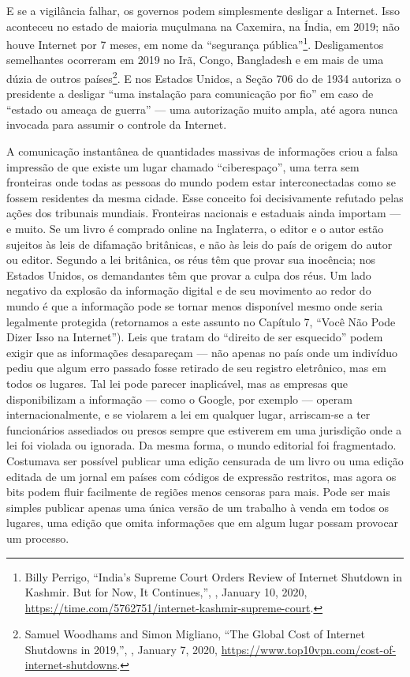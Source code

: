 E se a vigilância falhar, os governos podem simplesmente desligar a
Internet. Isso aconteceu no estado de maioria muçulmana na Caxemira, na Índia,
em 2019; não houve Internet por 7 meses, em nome da ``segurança
pública''\footnote{Billy Perrigo, ``India's Supreme Court Orders Review of
Internet Shutdown in Kashmir. But for Now, It Continues,'', ,
January 10, 2020,
\url{https://time.com/5762751/internet-kashmir-supreme-court}.}.
Desligamentos semelhantes ocorreram em 2019 no Irã, Congo, Bangladesh e em mais
de uma dúzia de outros países\footnote{Samuel Woodhams and Simon Migliano, ``The
Global Cost of Internet Shutdowns in 2019,'', , January 7,
2020, \url{https://www.top10vpn.com/cost-of-internet-shutdowns}.}. E nos Estados
Unidos, a Seção 706 do  de 1934 autoriza o presidente
a desligar ``uma instalação para comunicação por fio'' em caso de ``estado ou
ameaça de guerra'' --- uma autorização muito ampla, até agora nunca invocada
para assumir o controle da Internet.

A comunicação instantânea de quantidades massivas de informações criou a falsa
impressão de que existe um lugar chamado ``ciberespaço'', uma terra sem
fronteiras onde todas as pessoas do mundo podem estar interconectadas como se
fossem residentes da mesma cidade. Esse conceito foi decisivamente refutado
pelas ações dos tribunais mundiais. Fronteiras nacionais e estaduais ainda
importam --- e muito. Se um livro é comprado online na Inglaterra, o editor e o
autor estão sujeitos às leis de difamação britânicas, e não às leis do país de
origem do autor ou editor. Segundo a lei britânica, os réus têm que provar sua
inocência; nos Estados Unidos, os demandantes têm que provar a culpa dos
réus. Um lado negativo da explosão da informação digital e de seu movimento ao
redor do mundo é que a informação pode se tornar menos disponível mesmo onde
seria legalmente protegida (retornamos a este assunto no Capítulo 7, ``Você Não
Pode Dizer Isso na Internet''). Leis que tratam do ``direito de ser esquecido''
podem exigir que as informações desapareçam --- não apenas no país onde um
indivíduo pediu que algum erro passado fosse retirado de seu registro
eletrônico, mas em todos os lugares. Tal lei pode parecer inaplicável, mas as
empresas que disponibilizam a informação --- como o Google, por exemplo ---
operam internacionalmente, e se violarem a lei em qualquer lugar, arriscam-se a
ter funcionários assediados ou presos sempre que estiverem em uma jurisdição
onde a lei foi violada ou ignorada. Da mesma forma, o mundo editorial foi
fragmentado. Costumava ser possível publicar uma edição censurada de um livro ou
uma edição editada de um jornal em países com códigos de expressão restritos,
mas agora os bits podem fluir facilmente de regiões menos censoras para
mais. Pode ser mais simples publicar apenas uma única versão de um trabalho à
venda em todos os lugares, uma edição que omita informações que em algum lugar
possam provocar um processo.
